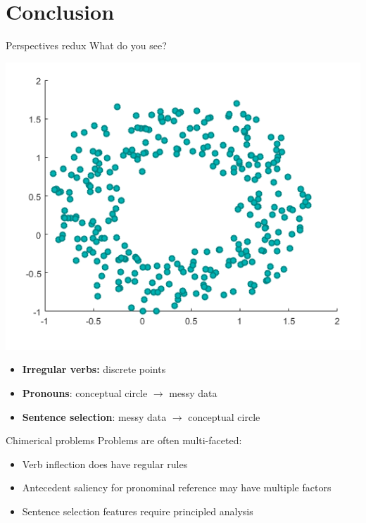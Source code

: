 \documentclass[10pt, compress]{beamer}
\begin{document}

\section{Conclusion}
\begin{frame}{Perspectives redux}
	What do you see?
	\begin{center}
		\includegraphics[width=.6\textwidth]{images/circleplot.png}
	\end{center}

	\pause
	\begin{itemize}
		\item \textbf{Irregular verbs:} discrete points	\pause
		\item \textbf{Pronouns}: conceptual circle $\rightarrow$ messy data	\pause
		\item \textbf{Sentence selection}: messy data $\rightarrow$ conceptual circle
	\end{itemize}
\end{frame}

\begin{frame}{Chimerical problems}
	Problems are often multi-faceted:

	\begin{itemize}
		\item Verb inflection does have regular rules
		\item Antecedent saliency for pronominal reference may have multiple factors
		\item Sentence selection features require principled analysis
	\end{itemize}
\end{frame}
\end{document}

